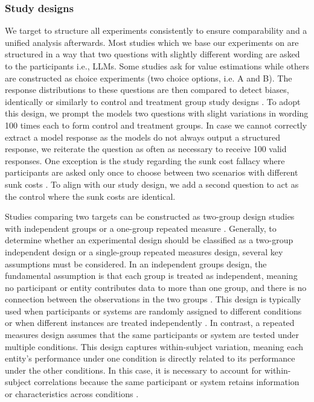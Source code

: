 \subsubsection{Study designs}
\par We target to structure all experiments consistently to ensure comparability and a unified analysis afterwards. Most studies which we base our experiments on are structured in a way that two  questions with slightly different wording are asked to the participants i.e., LLMs. Some studies ask for value estimations while others are constructed as choice experiments (two choice options, i.e. A and B). The response distributions to these questions are then compared to detect biases, identically or similarly to control and treatment group study designs \parencite{cohen1988statistical,morris2002combining}. To adopt this design, we prompt the models two questions with slight variations in wording 100 times each to form control and treatment groups. In case we cannot correctly extract a model response as the models do not always output a structured response, we reiterate the question as often as necessary to receive 100 valid responses. One exception is the study regarding the sunk cost fallacy where participants are asked only once to choose between two scenarios with different sunk costs \parencite{arkes1985psychology}. To align with our study design, we add a second question to act as the control where the sunk costs are identical.

\par Studies comparing two targets can be constructed as two-group design studies with independent groups or a one-group repeated measure \parencite{dunlap1996meta,goulet2018review}. Generally, to determine whether an experimental design should be classified as a two-group independent design or a single-group repeated measures design, several key assumptions must be considered. In an independent groups design, the fundamental assumption is that each group is treated as independent, meaning no participant or entity contributes data to more than one group, and there is no connection between the observations in the two groups \parencite{morris2002combining}. This design is typically used when participants or systems are randomly assigned to different conditions or when different instances are treated independently \parencite{cohen1988statistical,morris2002combining}. In contrast, a repeated measures design assumes that the same participants or system are tested under multiple conditions. This design captures within-subject variation, meaning each entity's performance under one condition is directly related to its performance under the other conditions. In this case, it is necessary to account for within-subject correlations because the same participant or system retains information or characteristics across conditions \parencite{dunlap1996meta,morris2002combining}.


